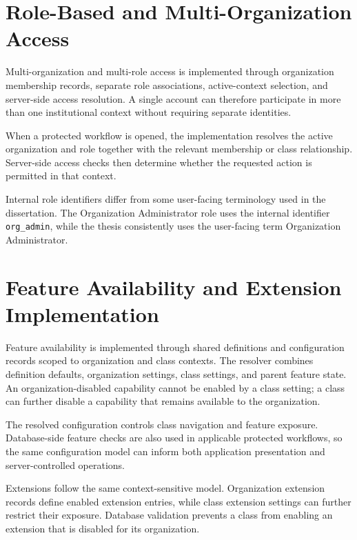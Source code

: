 \section{Role-Based and Multi-Organization Access}
\label{sec:role_based_multi_organization_access}

Multi-organization and multi-role access is implemented through organization
membership records, separate role associations, active-context selection, and
server-side access resolution. A single account can therefore participate in
more than one institutional context without requiring separate identities.

When a protected workflow is opened, the implementation resolves the active
organization and role together with the relevant membership or class
relationship. Server-side access checks then determine whether the requested
action is permitted in that context.

Internal role identifiers differ from some user-facing terminology used in the
dissertation. The Organization Administrator role uses the internal identifier
\texttt{org\_admin}, while the thesis consistently uses the user-facing term
Organization Administrator.

\section{Feature Availability and Extension Implementation}
\label{sec:feature_availability_extension_implementation}

Feature availability is implemented through shared definitions and
configuration records scoped to organization and class contexts. The resolver
combines definition defaults, organization settings, class settings, and parent
feature state. An organization-disabled capability cannot be enabled by a
class setting; a class can further disable a capability that remains available
to the organization.

The resolved configuration controls class navigation and feature exposure.
Database-side feature checks are also used in applicable protected workflows,
so the same configuration model can inform both application presentation and
server-controlled operations.

Extensions follow the same context-sensitive model. Organization extension
records define enabled extension entries, while class extension settings can
further restrict their exposure. Database validation prevents a class from
enabling an extension that is disabled for its organization.

